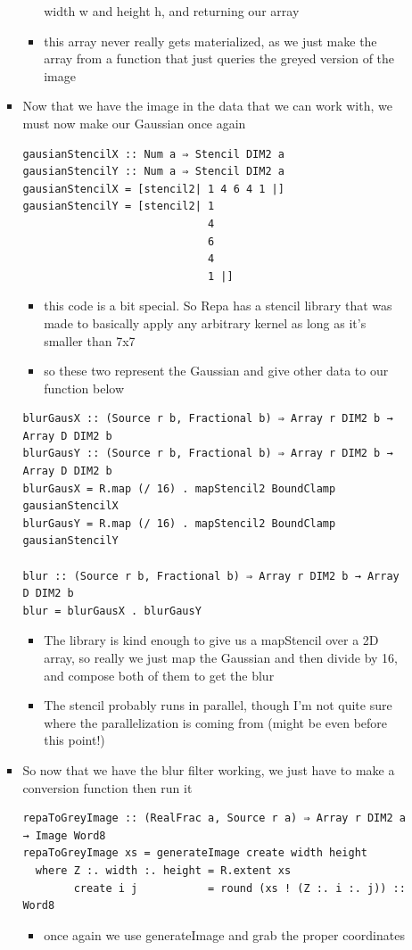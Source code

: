 \documentclass{article}
\begin{document}
\begin{enumerate}
\begin{enumerate}
\begin{itemize}
\begin{itemize}
width w and height h, and returning our array
\item this array never really gets materialized, as we just make the
array from a function that just queries the greyed version of the image
\end{itemize}
\item Now that we have the image in the data that we can work with, we
must now make our Gaussian once again
\begin{verbatim}
gausianStencilX :: Num a ⇒ Stencil DIM2 a
gausianStencilY :: Num a ⇒ Stencil DIM2 a
gausianStencilX = [stencil2| 1 4 6 4 1 |]
gausianStencilY = [stencil2| 1
                             4
                             6
                             4
                             1 |]
\end{verbatim}
\begin{itemize}
\item this code is a bit special. So Repa has a stencil library that was
made to basically apply any arbitrary kernel as long as it's
smaller than 7x7
\item so these two represent the Gaussian and give other data to our
function below
\end{itemize}
\begin{verbatim}
blurGausX :: (Source r b, Fractional b) ⇒ Array r DIM2 b → Array D DIM2 b
blurGausY :: (Source r b, Fractional b) ⇒ Array r DIM2 b → Array D DIM2 b
blurGausX = R.map (/ 16) . mapStencil2 BoundClamp gausianStencilX
blurGausY = R.map (/ 16) . mapStencil2 BoundClamp gausianStencilY

blur :: (Source r b, Fractional b) ⇒ Array r DIM2 b → Array D DIM2 b
blur = blurGausX . blurGausY
\end{verbatim}
\begin{itemize}
\item The library is kind enough to give us a mapStencil over a 2D
array, so really we just map the Gaussian and then divide by 16, and compose
both of them to get the blur

\item The stencil probably runs in parallel, though I'm not quite sure
where the parallelization is coming from (might be even before
this point!)
\end{itemize}

\item So now that we have the blur filter working, we just have to make a
conversion function then run it
\begin{verbatim}
repaToGreyImage :: (RealFrac a, Source r a) ⇒ Array r DIM2 a → Image Word8
repaToGreyImage xs = generateImage create width height
  where Z :. width :. height = R.extent xs
        create i j           = round (xs ! (Z :. i :. j)) :: Word8
\end{verbatim}
\begin{itemize}
\item once again we use generateImage and grab the proper coordinates
\end{itemize}


\end{itemize}
\end{enumerate}
\end{enumerate}
\end{document}
